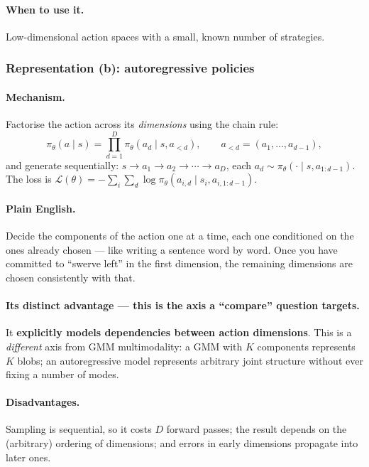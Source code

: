 \documentclass[11pt,a4paper]{article}
\begin{document}
\paragraph{When to use it.} Low-dimensional action spaces with a small,
known number of strategies.

\subsubsection{Representation (b): autoregressive policies}

\paragraph{Mechanism.} Factorise the action across its \emph{dimensions} using
the chain rule:
\[
\pi_\theta(a\mid s)=\prod_{d=1}^{D}\pi_\theta(a_d\mid s,a_{<d}),
\qquad a_{<d}=(a_1,\dots,a_{d-1}),
\]
and generate sequentially: $s\to a_1\to a_2\to\cdots\to a_D$, each
$a_d\sim\pi_\theta(\cdot\mid s,a_{1:d-1})$. The loss is
$\mathcal L(\theta)=-\sum_i\sum_d \log \pi_\theta(a_{i,d}\mid s_i,a_{i,1:d-1})$.

\paragraph{Plain English.} Decide the components of the action one at a time,
each one conditioned on the ones already chosen --- like writing a sentence
word by word. Once you have committed to ``swerve left'' in the first
dimension, the remaining dimensions are chosen consistently with that.

\paragraph{Its distinct advantage --- this is the axis a ``compare'' question
targets.} It \textbf{explicitly models dependencies between action
dimensions}. This is a \emph{different} axis from GMM multimodality: a GMM
with $K$ components represents $K$ blobs; an autoregressive model represents
arbitrary joint structure without ever fixing a number of modes.

\paragraph{Disadvantages.} Sampling is sequential, so it costs $D$ forward
passes; the result depends on the (arbitrary) ordering of dimensions; and
errors in early dimensions propagate into later ones.
\end{document}
